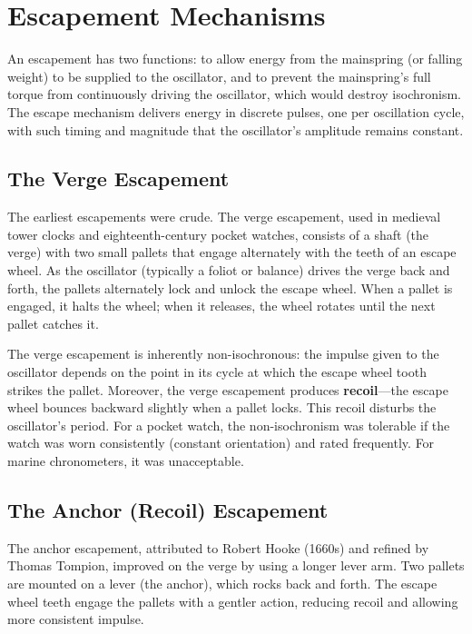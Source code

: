 \section{Escapement Mechanisms}

An escapement has two functions: to allow energy from the mainspring (or falling weight) to be supplied to the oscillator, and to prevent the mainspring's full torque from continuously driving the oscillator, which would destroy isochronism. The escape mechanism delivers energy in discrete pulses, one per oscillation cycle, with such timing and magnitude that the oscillator's amplitude remains constant.

\subsection{The Verge Escapement}

The earliest escapements were crude. The verge escapement, used in medieval tower clocks and eighteenth-century pocket watches, consists of a shaft (the verge) with two small pallets that engage alternately with the teeth of an escape wheel. As the oscillator (typically a foliot or balance) drives the verge back and forth, the pallets alternately lock and unlock the escape wheel. When a pallet is engaged, it halts the wheel; when it releases, the wheel rotates until the next pallet catches it.

The verge escapement is inherently non-isochronous: the impulse given to the oscillator depends on the point in its cycle at which the escape wheel tooth strikes the pallet. Moreover, the verge escapement produces \textbf{recoil}—the escape wheel bounces backward slightly when a pallet locks. This recoil disturbs the oscillator's period. For a pocket watch, the non-isochronism was tolerable if the watch was worn consistently (constant orientation) and rated frequently. For marine chronometers, it was unacceptable.

\subsection{The Anchor (Recoil) Escapement}

The anchor escapement, attributed to Robert Hooke (1660s) and refined by Thomas Tompion, improved on the verge by using a longer lever arm. Two pallets are mounted on a lever (the anchor), which rocks back and forth. The escape wheel teeth engage the pallets with a gentler action, reducing recoil and allowing more consistent impulse.

